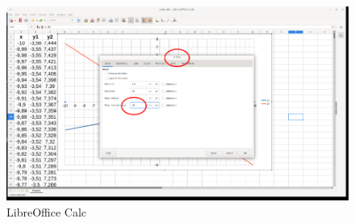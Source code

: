 \begin{figure}[h!]		
	\centering
   	\includegraphics[width=8.0in]{pictures/picture_027.png}
  	\caption{LibreOffice Calc}
   	\label{fig:LibreOfficeCalc027}
\end{figure}